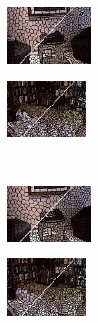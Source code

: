 \begin{figure}
\begin{subfigure}[b]{0.129\textwidth}
    \end{subfigure}
    \begin{subfigure}[b]{0.02\textwidth}
    \end{subfigure}
    \begin{subfigure}[b]{0.1375\textwidth}
        \includegraphics[height=1.65cm]{pictures/nyuv2/vc/cropped/vc_00001297_contours}
    \end{subfigure}
    \begin{subfigure}[b]{0.129\textwidth}
        \includegraphics[height=1.65cm]{pictures/sunrgbd/vc/cropped/vc_00007477_contours}
    \end{subfigure}\\
    \begin{subfigure}[b]{0.02\textwidth}
    \end{subfigure}
    \begin{subfigure}[b]{0.1375\textwidth}
        \includegraphics[height=1.65cm]{pictures/nyuv2/ccs/cropped/ccs_00001297_contours}
    \end{subfigure}
    \begin{subfigure}[b]{0.129\textwidth}
        \includegraphics[height=1.65cm]{pictures/sunrgbd/ccs/cropped/ccs_00007477_contours}
    \end{subfigure}
    \begin{subfigure}[b]{0.02\textwidth}

\end{subfigure}
\end{figure}
